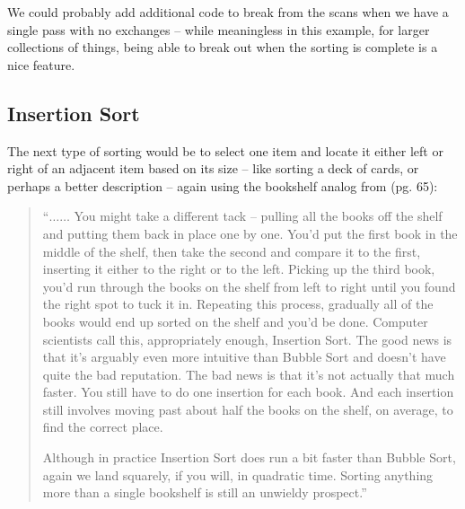 We could probably add additional code to break from the scans when we have a single pass with no exchanges -- while meaningless in this example, for larger collections of things, being able to break out when the sorting is complete is a nice feature.
\clearpage

\subsection{Insertion Sort}
The next type of sorting would be to select one item and locate it either left or right of an adjacent item based on its size -- like sorting a deck of cards, or perhaps a better description -- again using the bookshelf analog from \cite{Christian2016} (pg. 65):
\begin{quote}
``$\dots \dots$ You might take a different tack -- pulling all the books off the shelf and putting them back in place one by one. You'd put the first book in the middle of the shelf, then take the second and compare it to the first, inserting it either to the right or to the left. Picking up the third book, you'd run through the books on the shelf from left to right until you found the right spot to tuck it in. Repeating this process, gradually all of the books would end up sorted on the shelf and you'd be done. Computer scientists call this, appropriately enough, Insertion Sort. The good news is that it's arguably even more intuitive than Bubble Sort and doesn't have quite the bad reputation. The bad news is that it's not actually that much faster. You still have to do one insertion for each book. And each insertion still involves moving past about half the books on the shelf, on average, to find the correct place.

Although in practice Insertion Sort does run a bit faster than Bubble Sort, again we land squarely, if you will, in quadratic time. Sorting anything more than a single bookshelf is still an unwieldy prospect.''
\end{quote}

